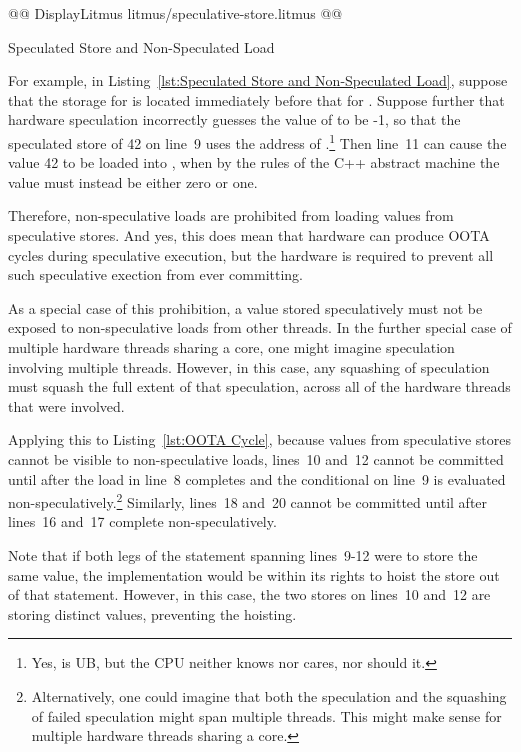 \documentclass[10]{article}
\begin{document}
\begin{listing}[tbp]
@@ DisplayLitmus litmus/speculative-store.litmus @@
\caption{Speculated Store and Non-Speculated Load}
\label{lst:Speculated Store and Non-Speculated Load}
\end{listing}

For example, in Listing~\ref{lst:Speculated Store and Non-Speculated Load},
suppose that the storage for  is located immediately before that
for .
Suppose further that hardware speculation incorrectly guesses the value
of  to be -1, so that the speculated store of 42 on line~9 uses
the address of .\footnote{
	Yes,  is UB, but the CPU neither knows
	nor cares, nor should it.}
Then line~11 can cause the value 42 to be loaded into , when
by the rules of the C++ abstract machine the value must instead be
either zero or one.

Therefore, non-speculative loads are prohibited from loading values from
speculative stores.
And yes, this does mean that hardware can produce OOTA cycles during
speculative execution, but the hardware is required to prevent all such
speculative exection from ever committing.

As a special case of this prohibition, a value stored speculatively must
not be exposed to non-speculative loads from other threads.
In the further special case of multiple hardware threads sharing a core,
one might imagine speculation involving multiple threads.
However, in this case, any squashing of speculation must squash the
full extent of that speculation, across all of the hardware threads
that were involved.

Applying this to Listing~\ref{lst:OOTA Cycle}, because values from
speculative stores cannot be visible to non-speculative loads, lines~10
and~12 cannot be committed until after the load in line~8 completes
and the conditional on line~9 is evaluated non-speculatively.\footnote{
	Alternatively, one could imagine that both the speculation
	and the squashing of failed speculation might span multiple
	threads.
	This might make sense for multiple hardware threads sharing
	a core.}
Similarly, lines~18 and~20 cannot be committed until after lines~16
and~17 complete non-speculatively.

Note that if both legs of the  statement spanning lines~9-12 were
to store the same value, the implementation would be within its rights
to hoist the store out of that  statement.
However, in this case, the two stores on lines~10 and~12 are storing
distinct values, preventing the hoisting.
\end{document}
